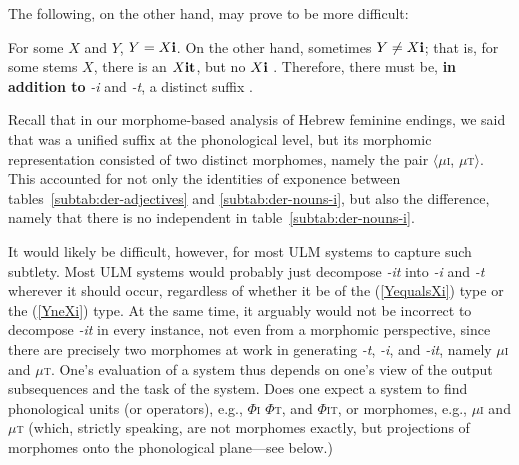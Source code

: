 The following, on the other hand, may prove to be more difficult:
\begin{exe} \label{ex:observations2}
\ex  For some $X$ and $Y$, $Y=X\text{\textbf{i}}$. \label{ex:YequalsXi} 
\ex  On the other hand, sometimes $Y \ne X\text{\textbf{i}}$; that is, for some stems 
$X$, there is an $X\text{\textbf{it}}$, but no $X\text{\textbf{i}}$ . \label{YneXi}
\ex Therefore, there must be, \textbf{in addition to} \textit{-i} and \textit{-t}, 
a distinct suffix .
\end{exe}
Recall that in our morphome-based analysis of Hebrew feminine endings, we said 
that  was a unified suffix at the phonological level, but its morphomic 
representation consisted of two distinct morphomes, namely the pair 
$\langle$$\mu$\textsc{i}, $\mu$\textsc{t}$\rangle$. This accounted
for not only the identities of exponence between tables~\ref{subtab:der-adjectives} 
and \ref{subtab:der-nouns-i}, but also the difference, namely that there is no independent
 in table~\ref{subtab:der-nouns-i}. 

It would likely be difficult, however, for most \ac{ULM} systems to capture such subtlety. 
Most \ac{ULM} systems would probably just decompose \textit{-it} 
into \textit{-i} and \textit{-t} wherever it should occur, regardless of whether it be of the
 (\ref{YequalsXi}) type or the (\ref{YneXi}) type. At the same time, it arguably would not be incorrect to decompose \textit{-it} in every instance, not even from a morphomic perspective,
since there are precisely two morphomes at work in generating \textit{-t}, \textit{-i}, and \textit{-it}, 
 namely $\mu$\textsc{i} and $\mu$\textsc{t}. 
One's evaluation of a system thus depends on one's view of the output subsequences and the task of the system. Does one 
expect a system to find phonological units (or operators), e.g., $\Phi$\textsc{i} $\Phi$\textsc{t}, and $\Phi$\textsc{it}, or 
morphomes, e.g., 
$\mu$\textsc{i} and $\mu$\textsc{t} (which, strictly speaking, are not morphomes exactly, but projections of morphomes onto 
the phonological plane---see below.)

